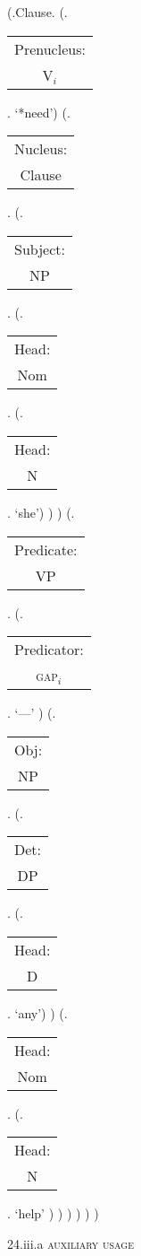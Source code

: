 \documentclass[12pt,letterpaper]{article}
\begin{document}
\begin{figure}
	\begin{center}
		\begin{parsetree}
			(.Clause.
			(.\begin{tabular}{c}Prenucleus:\\V$_i$\end{tabular}. `*need')
			(.\begin{tabular}{c}Nucleus:\\Clause\end{tabular}.    
			(.\begin{tabular}{c}Subject:\\NP\end{tabular}.  
			(.\begin{tabular}{c}Head:\\Nom\end{tabular}.
			(.\begin{tabular}{c}Head:\\N\end{tabular}. `she')
			)
			)
			(.\begin{tabular}{c}Predicate:\\VP\end{tabular}.
			(.\begin{tabular}{c}Predicator:\\\textsc{gap}$_i$\end{tabular}.    `---' )
			(.\begin{tabular}{c}Obj:\\NP\end{tabular}.
			(.\begin{tabular}{c}Det:\\DP\end{tabular}.
			(.\begin{tabular}{c}Head:\\D\end{tabular}. `any')
			)
			(.\begin{tabular}{c}Head:\\Nom\end{tabular}.
			(.\begin{tabular}{c}Head:\\N\end{tabular}. `help' )
			)
			)
			)
			)
			)
			
		\end{parsetree}
		\hfill \break \hfill \break
		24.iii.a \textsc{auxiliary usage}
	\end{center}
\end{figure}
\end{document}
